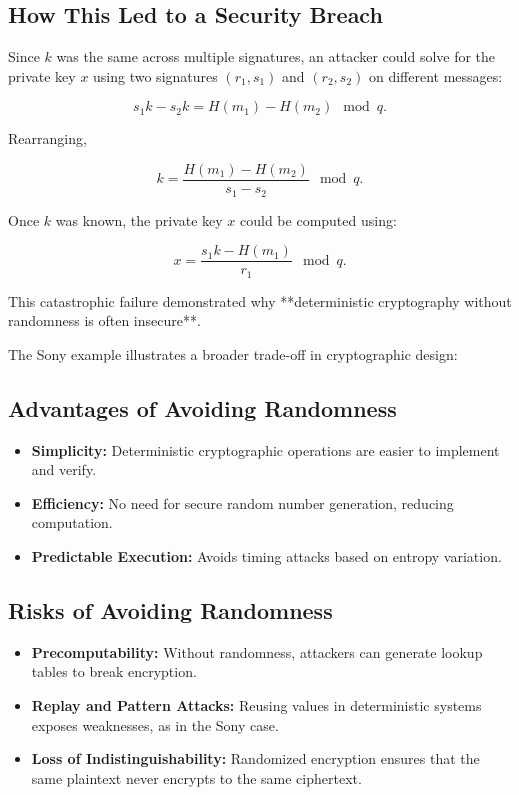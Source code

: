 \subsection{How This Led to a Security Breach}
Since \( k \) was the same across multiple signatures, an attacker could solve for the private key \( x \) using two signatures \( (r_1, s_1) \) and \( (r_2, s_2) \) on different messages:

\begin{equation}
    s_1 k - s_2 k = H(m_1) - H(m_2) \mod q.
\end{equation}

Rearranging,

\begin{equation}
    k = \frac{H(m_1) - H(m_2)}{s_1 - s_2} \mod q.
\end{equation}

Once \( k \) was known, the private key \( x \) could be computed using:

\begin{equation}
    x = \frac{s_1 k - H(m_1)}{r_1} \mod q.
\end{equation}

This catastrophic failure demonstrated why **deterministic cryptography without randomness is often insecure**.


The Sony example illustrates a broader trade-off in cryptographic design:

\subsection{Advantages of Avoiding Randomness}
\begin{itemize}
    \item \textbf{Simplicity:} Deterministic cryptographic operations are easier to implement and verify.
    \item \textbf{Efficiency:} No need for secure random number generation, reducing computation.
    \item \textbf{Predictable Execution:} Avoids timing attacks based on entropy variation.
\end{itemize}

\subsection{Risks of Avoiding Randomness}
\begin{itemize}
    \item \textbf{Precomputability:} Without randomness, attackers can generate lookup tables to break encryption.
    \item \textbf{Replay and Pattern Attacks:} Reusing values in deterministic systems exposes weaknesses, as in the Sony case.
    \item \textbf{Loss of Indistinguishability:} Randomized encryption ensures that the same plaintext never encrypts to the same ciphertext.
\end{itemize}

